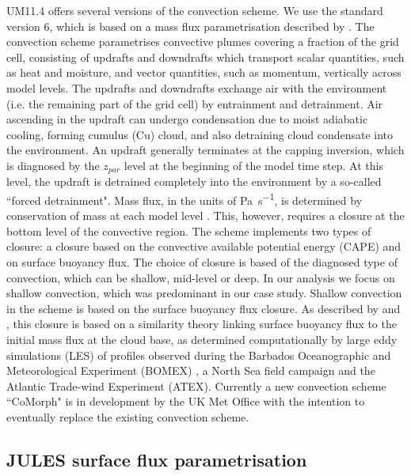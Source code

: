 UM11.4 offers several versions of the convection scheme. We use the standard
version 6, which is based on a mass flux parametrisation described by \cite{gregory1990}.
The convection scheme parametrises convective plumes covering a fraction of the grid cell,
consisting of updrafts and downdrafts which transport scalar quantities,
such as heat and moisture, and vector quantities, such as momentum, vertically
across model levels. The updrafts and downdrafts exchange air with the
environment (i.e. the remaining part of the grid cell) by entrainment and
detrainment. Air ascending in the updraft can undergo condensation due to
moist adiabatic cooling, forming cumulus (Cu) cloud, and also detraining cloud
condensate into the environment. An updraft generally terminates at the capping
inversion, which is diagnosed by the $z_{par}$ level at the beginning of the
model time step. At this level, the updraft
is detrained completely into the environment by a so-called ``forced detrainment".
Mass flux, in the units of \unit{Pa.s^{-1}}, is determined by
conservation of mass at each model level \citep{gregory1990}. This, however,
requires a closure at the bottom level of the convective region. The scheme implements
two types of closure: a closure based on the
convective available potential energy (CAPE) and on surface buoyancy flux.
The choice of closure is based of the diagnosed type of convection, which can be
shallow, mid-level or deep. In our analysis we focus on shallow convection,
which was predominant in our case study. Shallow convection in the scheme is based on the
surface buoyancy flux closure. As described by \cite{grant1999} and \cite{grant2001},
this closure is based on a similarity
theory linking surface buoyancy flux to the initial mass flux at the cloud
base, as determined computationally by large eddy simulations (LES) of profiles
observed during the Barbados Oceanographic and Meteorological Experiment (BOMEX)
\citep{davidson1968}, a North Sea field campaign \citep{smith1995} and the Atlantic Trade-wind
Experiment (ATEX). Currently a new convection scheme ``CoMorph" is in development by the UK Met Office
with the intention to eventually replace the existing convection scheme.

\subsection{JULES surface flux parametrisation}
\label{sec:4:jules}


